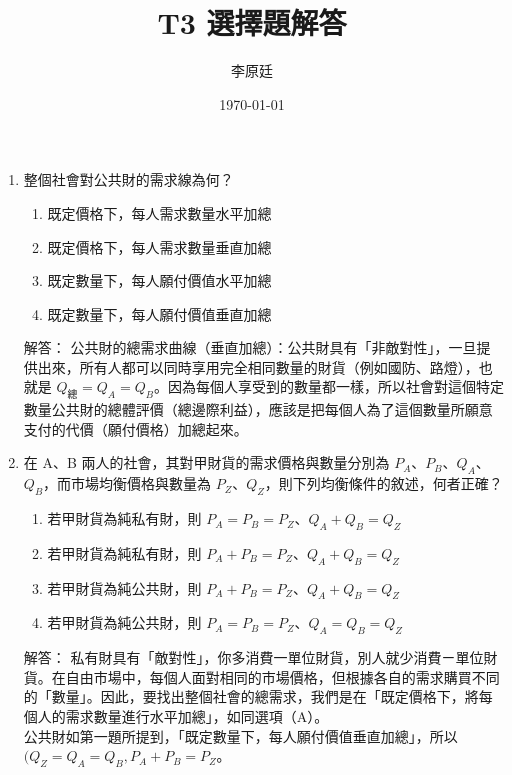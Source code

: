 \documentclass[12pt, a4paper]{article}
\begin{document}
\title{T3 選擇題解答} %
\author{李原廷} %
\date{\today} %

\maketitle

\begin{enumerate}

    \item 整個社會對公共財的需求線為何？
    \begin{enumerate}[label=\Alph*.]
        \item 既定價格下，每人需求數量水平加總
        \item 既定價格下，每人需求數量垂直加總
        \item 既定數量下，每人願付價值水平加總
        \item 既定數量下，每人願付價值垂直加總
    \end{enumerate}
    解答：
    公共財的總需求曲線（垂直加總）：公共財具有「非敵對性」，一旦提供出來，所有人都可以同時享用完全相同數量的財貨（例如國防、路燈），也就是 \(Q_{總} = Q_A = Q_B\)。因為每個人享受到的數量都一樣，所以社會對這個特定數量公共財的總體評價（總邊際利益），應該是把每個人為了這個數量所願意支付的代價（願付價格）加總起來。

    \item 在 A、B 兩人的社會，其對甲財貨的需求價格與數量分別為 \(P_A\)、\(P_B\)、\(Q_A\)、\(Q_B\)，而市場均衡價格與數量為 \(P_Z\)、\(Q_Z\)，則下列均衡條件的敘述，何者正確？
    \begin{enumerate}[label=\Alph*.]
        \item 若甲財貨為純私有財，則 \(P_A=P_B=P_Z\)、\(Q_A+Q_B=Q_Z\)
        \item 若甲財貨為純私有財，則 \(P_A+P_B=P_Z\)、\(Q_A+Q_B=Q_Z\)
        \item 若甲財貨為純公共財，則 \(P_A+P_B=P_Z\)、\(Q_A+Q_B=Q_Z\)
        \item 若甲財貨為純公共財，則 \(P_A=P_B=P_Z\)、\(Q_A=Q_B=Q_Z\)
    \end{enumerate}
    解答：
    私有財具有「敵對性」，你多消費一單位財貨，別人就少消費ㄧ單位財貨。在自由市場中，每個人面對相同的市場價格，但根據各自的需求購買不同的「數量」。因此，要找出整個社會的總需求，我們是在「既定價格下，將每個人的需求數量進行水平加總」，如同選項（A）。\\
    公共財如第一題所提到，「既定數量下，每人願付價值垂直加總」，所以$(Q_Z = Q_A = Q_B, P_A + P_B = P_Z$。


\end{enumerate}
\end{document}
